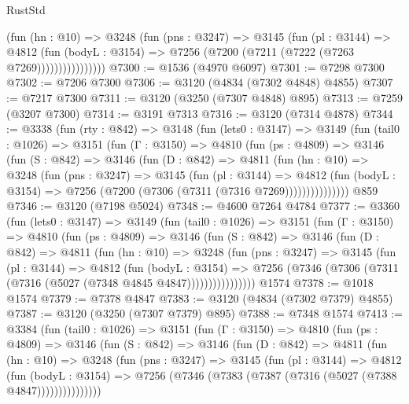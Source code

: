 \begin{lexlean}{RustStd}
\begin{coremodule}
                    (fun (hn : @10) =>
                    @3248
                      (fun (pns : @3247) =>
                      @3145
                        (fun (pl : @3144) =>
                        @4812
                          (fun (bodyL : @3154) =>
                          @7256 (@7200 (@7211 (@7222 (@7263 @7269))))))))))))))))
@7300 := @1536 (@4970 @6097)
@7301 := @7298 @7300
@7302 := @7206 @7300
@7306 := @3120 (@4834 (@7302 @4848) @4855)
@7307 := @7217 @7300
@7311 := @3120 (@3250 (@7307 @4848) @895)
@7313 := @7259 (@3207 @7300)
@7314 := @3191 @7313
@7316 := @3120 (@7314 @4878)
@7344 := @3338
    (fun (rty : @842) =>
    @3148
      (fun (lets0 : @3147) =>
      @3149
        (fun (tail0 : @1026) =>
        @3151
          (fun (Γ : @3150) =>
          @4810
            (fun (ps : @4809) =>
            @3146
              (fun (S : @842) =>
              @3146
                (fun (D : @842) =>
                @4811
                  (fun (hn : @10) =>
                  @3248
                    (fun (pns : @3247) =>
                    @3145
                      (fun (pl : @3144) =>
                      @4812
                        (fun (bodyL : @3154) =>
                        @7256 (@7200 (@7306 (@7311 (@7316 @7269)))))))))))))))
    @859
@7346 := @3120 (@7198 @5024)
@7348 := @4600 @7264 @4784
@7377 := @3360
    (fun (lets0 : @3147) =>
    @3149
      (fun (tail0 : @1026) =>
      @3151
        (fun (Γ : @3150) =>
        @4810
          (fun (ps : @4809) =>
          @3146
            (fun (S : @842) =>
            @3146
              (fun (D : @842) =>
              @4811
                (fun (hn : @10) =>
                @3248
                  (fun (pns : @3247) =>
                  @3145
                    (fun (pl : @3144) =>
                    @4812
                      (fun (bodyL : @3154) =>
                      @7256 (@7346 (@7306 (@7311 (@7316 (@5027 (@7348 @4845 @4847))))))))))))))))
    @1574
@7378 := @1018 @1574
@7379 := @7378 @4847
@7383 := @3120 (@4834 (@7302 @7379) @4855)
@7387 := @3120 (@3250 (@7307 @7379) @895)
@7388 := @7348 @1574
@7413 := @3384
    (fun (tail0 : @1026) =>
    @3151
      (fun (Γ : @3150) =>
      @4810
        (fun (ps : @4809) =>
        @3146
          (fun (S : @842) =>
          @3146
            (fun (D : @842) =>
            @4811
              (fun (hn : @10) =>
              @3248
                (fun (pns : @3247) =>
                @3145
                  (fun (pl : @3144) =>
                  @4812
                    (fun (bodyL : @3154) =>
                    @7256 (@7346 (@7383 (@7387 (@7316 (@5027 (@7388 @4847)))))))))))))))

\end{coremodule}
\end{lexlean}
